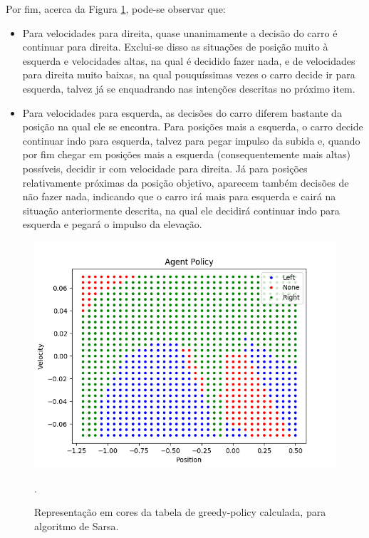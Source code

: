 \documentclass[conference]{IEEEtran}
\begin{document}
	Por fim, acerca da Figura \ref{agent_decision}, pode-se observar que:
	
\begin{itemize}

\item Para velocidades para direita, quase unanimamente a decisão do carro é continuar para direita. Exclui-se disso as situações de posição muito à esquerda e velocidades altas, na qual é decidido fazer nada, e de velocidades para direita muito baixas, na qual pouquíssimas vezes o carro decide ir para esquerda, talvez já se enquadrando nas intenções descritas no próximo item.

\item Para velocidades para esquerda, as decisões do carro diferem bastante da posição na qual ele se encontra. Para posições mais a esquerda, o carro decide continuar indo para esquerda, talvez para pegar impulso da subida e, quando por fim chegar em posições mais a esquerda (consequentemente mais altas) possíveis, decidir ir com velocidade para direita. Já para posições relativamente próximas da posição objetivo, aparecem também decisões de não fazer nada, indicando que o carro irá mais para esquerda e cairá na situação anteriormente descrita, na qual ele decidirá continuar indo para esquerda e pegará o impulso da elevação.

\end{itemize}

\begin{figure}[htbp]
\centering
\centerline{\includegraphics[scale=0.5]{imagens/agent_decision.png}}
\caption{Representação em cores da tabela de greedy-policy calculada, para algoritmo de Sarsa.}.
\label{agent_decision}
\end{figure} 
\end{document}
